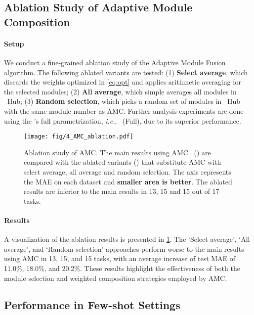 \subsection{Ablation Study of Adaptive Module Composition}
\label{exp:ablation}

\paragraph{Setup}
We conduct a fine-grained ablation study of the Adaptive Module Fusion algorithm. The following ablated variants are tested: (1) \textbf{Select average}, which discards the weights optimized in \cref{eq:opt} and applies arithmetic averaging for the selected modules; (2) \textbf{All average}, which simple averages all modules in \name \ Hub; (3) \textbf{Random selection}, which picks a random set of modules in \name \ Hub with the same module number as AMC. Further analysis experiments are done using the \name's full parametrization, \textit{i.e.}, \name \ (Full), due to its superior performance.

\begin{figure}[!t]
    \centering
    \texttt{[image: fig/4\_AMC\_ablation.pdf]}   
    \caption{Ablation study of AMC. The main results using AMC \ ({\color{mypurple}{purple}}) are compared with the ablated variants ({\color{orange}{orange}}) that substitute AMC with select average, all average and random selection.
    The axis represents the MAE on each dataset and \textbf{smaller area is better}. The ablated results are inferior to the main results in 13, 15 and 15 out of 17 tasks.}
    \label{fig:ablation}
\end{figure}

\paragraph{Results}
A visualization of the ablation results is presented in \cref{fig:ablation}. The `Select average', `All average', and `Random selection' approaches perform worse to the main results using AMC in 13, 15, and 15 tasks, with an average increase of test MAE of 11.0\%, 18.0\%, and 20.2\%. These results highlight the effectiveness of both the module selection and weighted composition strategies employed by AMC.


\subsection{Performance in Few-shot Settings}
\label{exp:few-shot}
